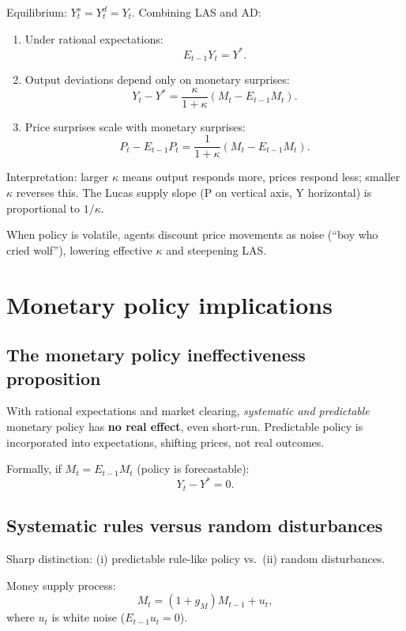 \documentclass[
  letterpaper,
  DIV=11,
  numbers=noendperiod]{scrartcl}
\begin{document}
Equilibrium: \(Y_t^s = Y_t^d = Y_t\). Combining LAS and AD:

\begin{enumerate}
\def\labelenumi{\arabic{enumi}.}
\item
  Under rational expectations: \[E_{t-1}Y_t = Y^*.\]
\item
  Output deviations depend only on monetary surprises:
  \[Y_t - Y^* = \frac{\kappa}{1+\kappa}(M_t - E_{t-1}M_t).\]
\item
  Price surprises scale with monetary surprises:
  \[P_t - E_{t-1}P_t = \frac{1}{1+\kappa}(M_t - E_{t-1}M_t).\]
\end{enumerate}

Interpretation: larger \(\kappa\) means output responds more, prices
respond less; smaller \(\kappa\) reverses this. The Lucas supply slope
(P on vertical axis, Y horizontal) is proportional to \(1/\kappa\).

When policy is volatile, agents discount price movements as noise (``boy
who cried wolf''), lowering effective \(\kappa\) and steepening LAS.

\section{Monetary policy
implications}\label{monetary-policy-implications}

\subsection{The monetary policy ineffectiveness
proposition}\label{the-monetary-policy-ineffectiveness-proposition}

With rational expectations and market clearing, \emph{systematic and
predictable} monetary policy has \textbf{no real effect}, even
short-run. Predictable policy is incorporated into expectations,
shifting prices, not real outcomes.

Formally, if \(M_t = E_{t-1}M_t\) (policy is forecastable):
\[Y_t - Y^* = 0.\]

\subsection{Systematic rules versus random
disturbances}\label{systematic-rules-versus-random-disturbances}

Sharp distinction: (i) predictable rule-like policy vs.~(ii) random
disturbances.

Money supply process: \[M_t = (1 + g_M)M_{t-1} + u_t,\] where \(u_t\) is
white noise (\(E_{t-1}u_t = 0\)).
\end{document}
